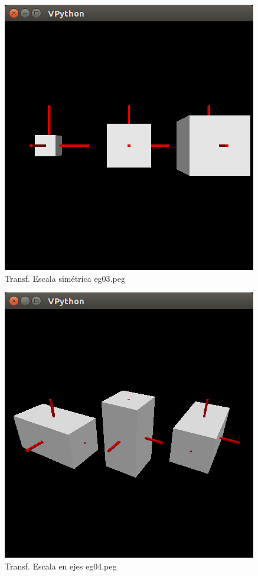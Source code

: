 \documentclass[10pt,a4paper]{article}
\begin{document}
\begin{figure}[H]
\centering
\includegraphics[scale=0.3]{eg03.png}
\caption{Transf. Escala simétrica  eg03.peg}
\end{figure}
\begin{figure}[H]
\centering
\includegraphics[scale=0.3]{eg04.png}
\caption{Transf. Escala en ejes eg04.peg}
\end{figure}
\end{document}
